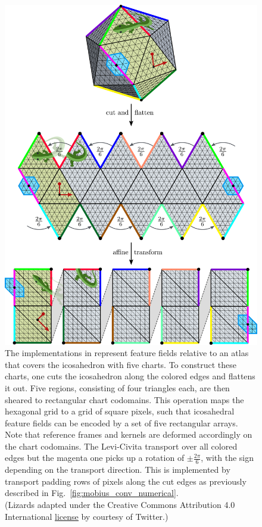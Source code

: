 \begin{figure}
    \centering
    \includegraphics[width=.9\textwidth]{figures/icosahedron_cutting.pdf}
    \vspace*{1.5ex}
    \caption{\small
        The implementations in \cite{liu2018icoAltAz,gaugeIco2019,zhang2019orientation} represent feature fields relative to an atlas that covers the icosahedron with five charts.
        To construct these charts, one cuts the icosahedron along the colored edges and flattens it out.
        Five regions, consisting of four triangles each, are then sheared to rectangular chart codomains.
        This operation maps the hexagonal grid to a grid of square pixels, such that icosahedral feature fields can be encoded by a set of five rectangular arrays.
        Note that reference frames and kernels are deformed accordingly on the chart codomains.
        The Levi-Civita transport over all colored edges but the magenta one picks up a rotation of $\pm\frac{2\pi}{6}$, with the sign depending on the transport direction.
        This is implemented by transport padding rows of pixels along the cut edges as previously described in Fig.~\ref{fig:mobius_conv_numerical}.
        {
        \\ \color{gray} \scriptsize
            (Lizards adapted under the Creative Commons Attribution 4.0 International
            \href{https://github.com/twitter/twemoji/blob/gh-pages/LICENSE-GRAPHICS}{\underline{license}}
            by courtesy of Twitter.)
        }
     }
    \label{fig:ico_cutting}
\end{figure}


